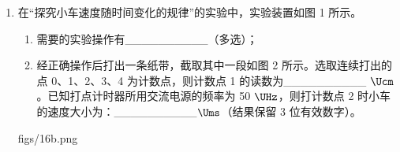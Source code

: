 \documentclass[\gkver]{gaokaozhenti}
\begin{document}
\begin{enumerate}
{（2）乙同学通过 U-I 图像求电阻，可减少实验的误差，则乙同学求电阻的方法更合理；

（3）由图像可知  $I - \frac{1}{L}$ 图像斜率

 $k=\frac{9.0-4.8}{3.8-2.0}=2.3\UmA\cdot\Um$

方法一：由电路可知

 $I_{g}r_{g}=(I-I_{g})\rho\frac{L}{S}$

解得

 $I=I_{g}+\frac{I_{g}r_{g}S}{\rho}\cdot\frac{1}{L}$

 $I_{g}=0.3\UmA$

由图像，则

 $\frac{I_{g}r_{g}S}{\rho}=2.3\UmA\cdot\Um$

若要把该表头 G 改装成量程为 9 $\UmA$ 的电流表，则并联的电阻
$$ \rho\frac{L}{S}=\frac{I_{g}r_{g}}{I^{\prime}-I_{g}} $$

即

$$ \frac{\rho}{I_{g}r_{g}S}L^{\prime}=\frac{1}{I^{\prime}-I_{g}} $$

解得  $L' = 0.26\Um$

方法二：延长图像可知，当  $I = 9.0\UmA$ 时可得  $\frac{1}{L} = 3.8$，即  $L' = 0.26\Um$
}

\item
在“探究小车速度随时间变化的规律”的实验中，实验装置如图 1 所示。
\begin{enumerate}
	\item
	需要的实验操作有\_\_\_\_\_\_\_\_\_\_（多选）；
	\item
	经正确操作后打出一条纸带，截取其中一段如图 2 所示。选取连续打出的点 0、1、2、3、4 为计数点，则计数点 1 的读数为\_\_\_\_\_\_\_\_\_\_ $\Ucm$。已知打点计时器所用交流电源的频率为 50 $\UHz$，则打计数点 2 时小车的速度大小为：\_\_\_\_\_\_\_\_\_\_$\Ums$（结果保留 3 位有效数字）。
\end{enumerate}
{figs/16b.png}
\end{enumerate}
\end{document}
